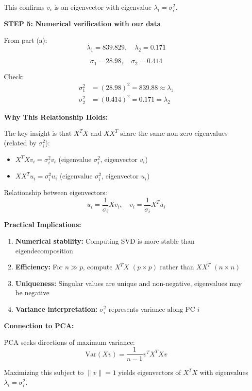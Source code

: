 \documentclass[12pt]{article}
\begin{document}
\begin{solution}
This confirms $v_i$ is an eigenvector with eigenvalue $\lambda_i = \sigma_i^2$.

\textbf{STEP 5: Numerical verification with our data}

From part (a):
\[
\lambda_1 = 839.829, \quad \lambda_2 = 0.171
\]

\[
\sigma_1 = 28.98, \quad \sigma_2 = 0.414
\]

Check:
\begin{align*}
\sigma_1^2 &= (28.98)^2 = 839.88 \approx \lambda_1 \\
\sigma_2^2 &= (0.414)^2 = 0.171 = \lambda_2
\end{align*}


\end{solution}

\begin{explanation}

\textbf{Why This Relationship Holds:}

The key insight is that $X^T X$ and $XX^T$ share the same non-zero eigenvalues (related by $\sigma_i^2$):
\begin{itemize}
    \item $X^T X v_i = \sigma_i^2 v_i$ (eigenvalue $\sigma_i^2$, eigenvector $v_i$)
    \item $XX^T u_i = \sigma_i^2 u_i$ (eigenvalue $\sigma_i^2$, eigenvector $u_i$)
\end{itemize}

Relationship between eigenvectors:
\[
u_i = \frac{1}{\sigma_i} Xv_i, \quad v_i = \frac{1}{\sigma_i} X^T u_i
\]

\textbf{Practical Implications:}

\begin{enumerate}
    \item \textbf{Numerical stability:} Computing SVD is more stable than eigendecomposition
    \item \textbf{Efficiency:} For $n \gg p$, compute $X^T X$ $(p \times p)$ rather than $XX^T$ $(n \times n)$
    \item \textbf{Uniqueness:} Singular values are unique and non-negative, eigenvalues may be negative
    \item \textbf{Variance interpretation:} $\sigma_i^2$ represents variance along PC $i$
\end{enumerate}

\textbf{Connection to PCA:}

PCA seeks directions of maximum variance:
\[
\text{Var}(Xv) = \frac{1}{n-1} v^T X^T X v
\]

Maximizing this subject to $\|v\| = 1$ yields eigenvectors of $X^T X$ with eigenvalues $\lambda_i = \sigma_i^2$.

\end{explanation}
\end{document}
